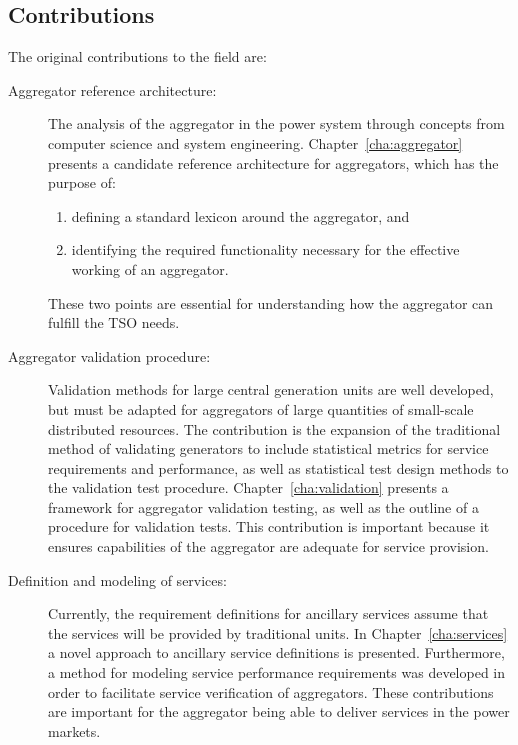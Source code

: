 \subsection*{Contributions}
The original contributions to the field are:
\begin{description}
	\item[Aggregator reference architecture:] The analysis of the aggregator in the power system through concepts from computer science and system engineering. Chapter~\ref{cha:aggregator} presents a candidate reference architecture for aggregators, which has the purpose of:
		\begin{enumerate}
			\item defining a standard lexicon around the aggregator, and
			\item identifying the required functionality necessary for the effective working of an aggregator.
		\end{enumerate}
		These two points are essential for understanding how the aggregator can fulfill the TSO needs.%
	\item[Aggregator validation procedure:] Validation methods for large central generation units are well developed, but must be adapted for aggregators of large quantities of small-scale distributed resources. The contribution is the expansion of the traditional method of validating generators to include statistical metrics for service requirements and performance, as well as statistical test design methods to the validation test procedure. Chapter~\ref{cha:validation} presents a framework for aggregator validation testing, as well as the outline of a procedure for validation tests. This contribution is important because it ensures capabilities of the aggregator are adequate for service provision.
	\item[Definition and modeling of services:] Currently, the requirement definitions for ancillary services assume that the services will be provided by traditional units. In Chapter~\ref{cha:services} a novel approach to ancillary service definitions is presented. Furthermore, a method for modeling service performance requirements was developed in order to facilitate service verification of aggregators. These contributions are important for the aggregator being able to deliver services in the power markets.

\end{description}
